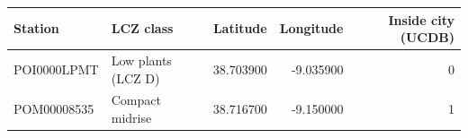 \begin{tabular}{llrrr}
\toprule
Station & LCZ class & Latitude & Longitude & Inside city (UCDB) \\
\midrule
POI0000LPMT & Low plants (LCZ D) & 38.703900 & -9.035900 & 0 \\
POM00008535 & Compact midrise & 38.716700 & -9.150000 & 1 \\
\bottomrule
\end{tabular}

